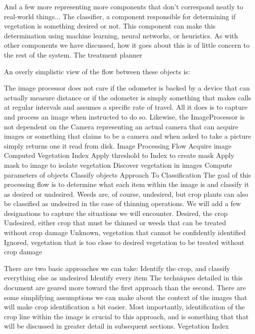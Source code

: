 \documentclass[letterpaper]{article}
\begin{document}
And a few more representing more components that don’t correspond neatly to real-world things...
The classifier, a component responsible for determining if vegetation is something desired or not. This component can make this determination using machine learning, neural networks, or heuristics. As with other components we have discussed, how it goes about this is of little concern to the rest of the system.
The treatment planner

An overly simplistic view of the flow between these objects is:



The image processor does not care if the odometer is backed by a device that can actually measure distance or if the odometer is simply something that makes calls at regular intervals and assumes a specific rate of travel.  All it does is to capture and process an image when instructed to do so. Likewise, the ImageProcessor is not dependent on the Camera representing an actual camera that can acquire images or something that claims to be a camera and when asked to take a picture simply returns one it read from disk.
Image Processing Flow
Acquire image
Computed Vegetation Index
Apply threshold to Index to create mask
Apply mask to image to isolate vegetation
Discover vegetation in images
Compute parameters of objects
Classify objects
Approach To Classification
The goal of this processing flow is to determine what each item within the image is and classify it as desired or undesired. Weeds are, of course, undesired, but crop plants can also be classified as undesired in the case of thinning operations. We will add a few designations to capture the situations we will encounter.
Desired, the crop
Undesired, either crop that must be thinned or weeds that can be treated without crop damage
Unknown, vegetation that cannot be confidently identified
Ignored, vegetation that is too close to desired vegetation to be treated without crop damage

There are two basic approaches we can take:
Identify the crop, and classify everything else as undesired
Identify every item
The techniques detailed in this document are geared more toward the first approach than the second. There are some simplifying assumptions we can make about the context of the images that will make crop identification a bit easier. Most importantly, identification of the crop line within the image is crucial to this approach, and is something that that will be discussed in greater detail in subsequent sections.
Vegetation Index
\end{document}
